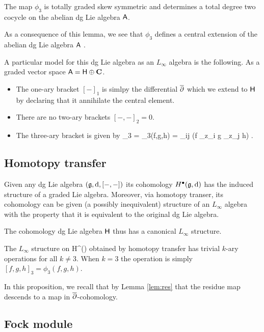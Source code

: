 \documentclass[11pt]{amsart}
\begin{document}
\begin{lem}
The map $\phi_3$ is totally graded skew symmetric and determines a total degree two cocycle on the abelian dg Lie algebra $\mathsf A$. 
\end{lem}

As a consequence of this lemma, we see that $\phi_3$ defines a central extension of the abelian dg Lie algebra $\mathsf A$ 
\beqn
\C \to \sfH \to \sfA .
\eeqn

A particular model for this dg Lie algebra as an $L_\infty$ algebra is the following. 
As a graded vector space $\mathsf A = \mathsf H \oplus \mathbf{C}$.
\begin{itemize} 
	\item The one-ary bracket $[-]_1$ is simlpy the differential $\overline{\partial}$ which we extend to $\mathsf H$ by declaring that it annihilate the central element. 
\item There are no two-ary brackets $[-,-]_2 = 0$. 
\item The three-ary bracket is given by 
\beqn
[f,g,h]_3 = \phi_3(f,g,h) = \ep_{ij} \Res(f \del_{z_i} g \del_{z_j} h) .
\eeqn
\end{itemize}

\subsection{Homotopy transfer}

Given any dg Lie algebra $(\mathfrak{g}, {\rm d}, [-,-])$ its cohomology $H^\bullet(\mathfrak{g},{\rm d})$ has the induced structure of a graded Lie algebra. 
Moreover, via homotopy transer, its cohomology can be given (a possibly inequivalent) structure of an $L_\infty$ algebra with the property that it is equivalent to the original dg Lie algebra. 

The cohomology dg Lie algebra $\mathsf H$ thus has a canonical $L_\infty$ structure. 

\begin{prop} 
The $L_\infty$ structure on 
\beqn
H^\bu(\sfH) \cong \C[z_i] \oplus \C[\lambda_i]\omega \oplus \C 
\eeqn
obtained by homotopy transfer has trivial $k$-ary operations for all $k \ne 3$.
When $k=3$ the operation is simply $[f,g,h]_3 = \phi_3(f,g,h)$.
\end{prop}

In this proposition, we recall that by Lemma \ref{lem:res} that the residue map descends to a map in $\overline{\partial}$-cohomology.

\subsection{Fock module}
\end{document}
